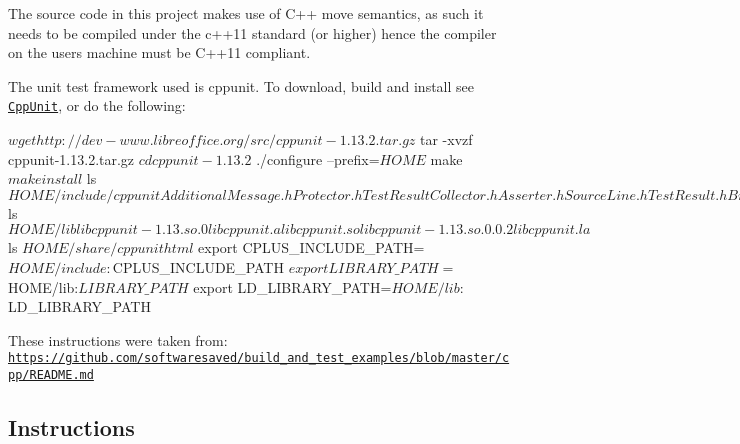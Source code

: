 The source code in this project makes use of C++ move semantics, as such it needs to be compiled under the c++11 standard (or higher) hence the compiler on the user\textquotesingle{}s machine must be C++11 compliant.

The unit test framework used is cppunit. To download, build and install see \href{http://www.freedesktop.org/wiki/Software/cppunit/}{\tt Cpp\+Unit}, or do the following\+: 
\begin{DoxyCode}
$ wget http://dev-www.libreoffice.org/src/cppunit-1.13.2.tar.gz
$ tar -xvzf cppunit-1.13.2.tar.gz
$ cd cppunit-1.13.2
$ ./configure --prefix=$HOME
$ make
$ make install 
$ ls $HOME/include/cppunit
AdditionalMessage.h          Protector.h           TestResultCollector.h
Asserter.h                   SourceLine.h          TestResult.h
BriefTestProgressListener.h  SynchronizedObject.h  TestRunner.h
CompilerOutputter.h          TestAssert.h          TestSuccessListener.h
config                       TestCaller.h          TestSuite.h
config-auto.h                TestCase.h            TextOutputter.h
Exception.h                  TestComposite.h       TextTestProgressListener.h
extensions                   TestFailure.h         TextTestResult.h
Message.h                    TestFixture.h         TextTestRunner.h
Outputter.h                  Test.h                tools
plugin                       TestLeaf.h            ui
portability                  TestListener.h        XmlOutputter.h
Portability.h                TestPath.h            XmlOutputterHook.h
$ ls $HOME/lib
libcppunit-1.13.so.0      libcppunit.a   libcppunit.so
libcppunit-1.13.so.0.0.2  libcppunit.la
$ ls $HOME/share/cppunit
html
$ export CPLUS\_INCLUDE\_PATH=$HOME/include:$CPLUS\_INCLUDE\_PATH
$ export LIBRARY\_PATH=$HOME/lib:$LIBRARY\_PATH
$ export LD\_LIBRARY\_PATH=$HOME/lib:$LD\_LIBRARY\_PATH
\end{DoxyCode}


These instructions were taken from\+: \href{https://github.com/softwaresaved/build_and_test_examples/blob/master/cpp/README.md}{\tt https\+://github.\+com/softwaresaved/build\+\_\+and\+\_\+test\+\_\+examples/blob/master/cpp/\+R\+E\+A\+D\+M\+E.\+md}

\subsection*{Instructions}


